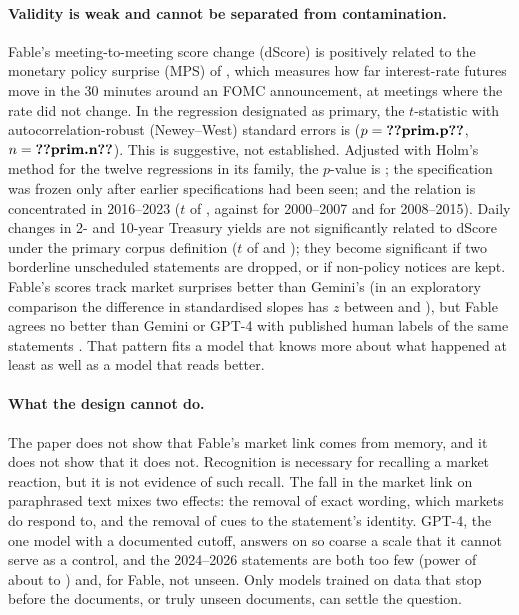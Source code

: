 \documentclass[11pt]{article}
\begin{document}
\paragraph{Validity is weak and cannot be separated from contamination.} Fable's meeting-to-meeting score
change (dScore) is positively related to the monetary policy surprise (MPS) of
\citet{bauer2023reassessment}, which measures how far interest-rate futures move in the 30 minutes
around an FOMC announcement, at meetings where the rate did not change. In the regression designated as
primary, the $t$-statistic with autocorrelation-robust (Newey--West) standard errors is 
($p=\R{prim.p}$, $n=\R{prim.n}$). This is suggestive, not established. Adjusted with Holm's method for
the twelve regressions in its family, the $p$-value is ; the specification was
frozen only after earlier specifications had been seen; and the relation is concentrated in 2016--2023
($t$ of , against  for 2000--2007 and  for
2008--2015). Daily changes in 2- and 10-year Treasury yields are not significantly related to dScore under
the primary corpus definition ($t$ of  and ); they become
significant if two borderline unscheduled statements are dropped, or if non-policy notices are kept.
Fable's scores track market surprises better than Gemini's (in an exploratory comparison the difference in
standardised slopes has $z$ between  and ), but Fable agrees no better than Gemini or
GPT-4 with published human labels of the same statements \citep{shah2023}. That pattern fits a model that
knows more about what happened at least as well as a model that reads better.

\paragraph{What the design cannot do.} The paper does not show that Fable's market link comes from
memory, and it does not show that it does not. Recognition is necessary for recalling a market reaction,
but it is not evidence of such recall. The fall in the market link on paraphrased text mixes two effects:
the removal of exact wording, which markets do respond to, and the removal of cues to the statement's
identity. GPT-4, the one model with a documented cutoff, answers on so coarse a scale that it cannot
serve as a control, and the 2024--2026 statements are both too few (power of about  to
) and, for Fable, not unseen. Only models trained on data that stop before the documents, or
truly unseen documents, can settle the question.
\end{document}
